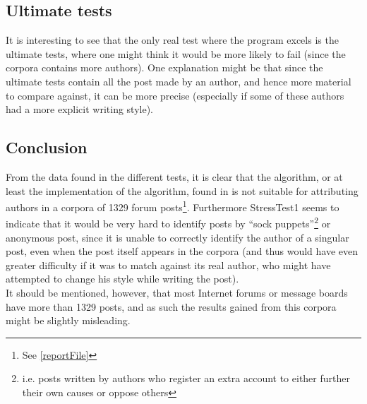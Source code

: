 \subsection{Ultimate tests}
It is interesting to see that the only real test where the program excels is the ultimate tests, where one might think it would be more likely to fail (since the corpora contains more authors). One explanation might be that since the ultimate tests contain all the post made by an author, and hence more material to compare against, it can be more precise (especially if some of these authors had a more explicit writing style).

\subsection{Conclusion}
From the data found in the different tests, it is clear that the algorithm, or at least the implementation of the algorithm, found in \cite{nr4} is not suitable for attributing authors in a corpora of 1329 forum posts\footnote{See \ref{reportFile}}. Furthermore StressTest1 seems to indicate that it would be very hard to identify posts by ``sock puppets''\footnote{i.e. posts written by authors who register an extra account to either further their own causes or oppose others} or anonymous post, since it is unable to correctly identify the author of a singular post, even when the post itself appears in the corpora (and thus would have even greater difficulty if it was to match against its real author, who might have attempted to change his style while writing the post).\\ 

It should be mentioned, however, that most Internet forums or message boards have more than 1329 posts, and as such the results gained from this corpora might be slightly misleading.

